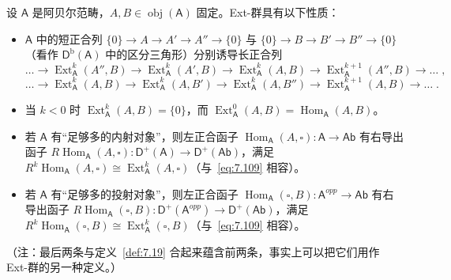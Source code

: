 \begin{Pro}\label{pro:7.21}
设 $\mathsf A$ 是阿贝尔范畴，$A,B\in\operatorname{obj}(\mathsf A)$ 固定。Ext-群具有以下性质：
\begin{itemize}
  \item $\mathsf A$ 中的短正合列 $\{0\}\to A\to A'\to A''\to\{0\}$ 与 $\{0\}\to B\to B'\to B''\to\{0\}$（看作 $\mathsf D^{\mathrm b}(\mathsf A)$ 中的区分三角形）分别诱导长正合列
  \[
  \dots\to\operatorname{Ext}^k_{\mathsf A}(A'',B)\to\operatorname{Ext}^k_{\mathsf A}(A',B)\to\operatorname{Ext}^k_{\mathsf A}(A,B)\to\operatorname{Ext}^{k+1}_{\mathsf A}(A'',B)\to\dots\;,
  \]
  \[
  \dots\to\operatorname{Ext}^k_{\mathsf A}(A,B)\to\operatorname{Ext}^k_{\mathsf A}(A,B')\to\operatorname{Ext}^k_{\mathsf A}(A,B'')\to\operatorname{Ext}^{k+1}_{\mathsf A}(A,B)\to\dots\;.
  \]
  \item 当 $k<0$ 时 $\operatorname{Ext}^k_{\mathsf A}(A,B)=\{0\}$，而 $\operatorname{Ext}^0_{\mathsf A}(A,B)=\operatorname{Hom}_{\mathsf A}(A,B)$。
  \item 若 $\mathsf A$ 有“足够多的内射对象”，则左正合函子 $\operatorname{Hom}_{\mathsf A}(A,\square):\mathsf A\to\mathsf{Ab}$ 有右导出函子 $R\operatorname{Hom}_{\mathsf A}(A,\square):\mathsf D^+(\mathsf A)\to\mathsf D^+(\mathsf{Ab})$，满足 $R^k\operatorname{Hom}_{\mathsf A}(A,\square)\cong\operatorname{Ext}^k_{\mathsf A}(A,\square)$（与~\eqref{eq:7.109} 相容）。
  \item 若 $\mathsf A$ 有“足够多的投射对象”，则左正合函子 $\operatorname{Hom}_{\mathsf A}(\square,B):\mathsf A^{opp}\to\mathsf{Ab}$ 有右导出函子 $R\operatorname{Hom}_{\mathsf A}(\square,B):\mathsf D^+(\mathsf A^{opp})\to\mathsf D^+(\mathsf{Ab})$，满足 $R^k\operatorname{Hom}_{\mathsf A}(\square,B)\cong\operatorname{Ext}^k_{\mathsf A}(\square,B)$（与~\eqref{eq:7.109} 相容）。
\end{itemize}
（注：最后两条与定义~\ref{def:7.19} 合起来蕴含前两条，事实上可以把它们用作 Ext-群的另一种定义。）
\end{Pro}

